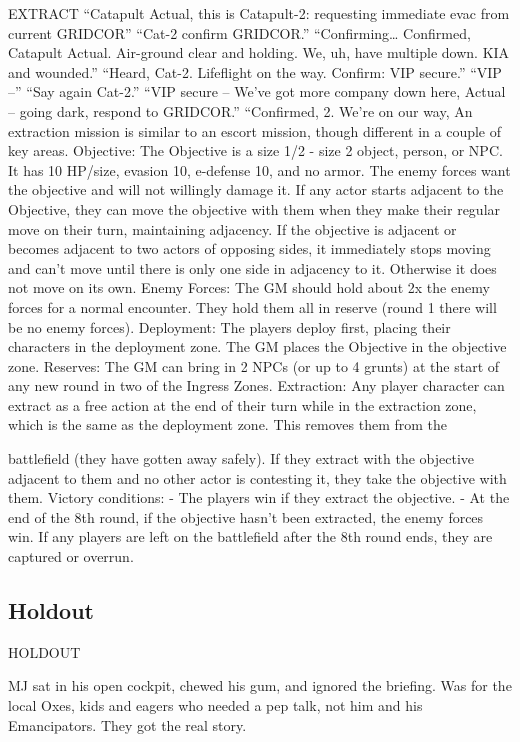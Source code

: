 EXTRACT
“Catapult Actual, this is Catapult-2: requesting immediate evac from current GRIDCOR” “Cat-2 confirm GRIDCOR.” “Confirming… Confirmed, Catapult Actual. Air-ground clear and holding. We, uh, have multiple down. KIA and wounded.” “Heard, Cat-2. Lifeflight on the way. Confirm: VIP secure.” “VIP --” “Say again Cat-2.” “VIP secure -- We’ve got more company down here, Actual -- going dark, respond to GRIDCOR.” “Confirmed, 2. We’re on our way, An extraction mission is similar to an escort mission, though different in a couple of key areas. Objective: The Objective is a size 1/2 - size 2 object, person, or NPC. It has 10 HP/size, evasion 10, e-defense 10, and no armor. The enemy forces want the objective and will not willingly damage it. If any actor starts adjacent to the Objective, they can move the objective with them when they make their regular move on their turn, maintaining adjacency. If the objective is adjacent or becomes adjacent to two actors of opposing sides, it immediately stops moving and can’t move until there is only one side in adjacency to it. Otherwise it does not move on its own.
Enemy Forces: The GM should hold about 2x the enemy forces for a normal encounter. They
hold them all in reserve (round 1 there will be no enemy forces).
Deployment: The players deploy first, placing their characters in the deployment zone. The GM
places the Objective in the objective zone.
Reserves: The GM can bring in 2 NPCs (or up to 4 grunts) at the start of any new round in two of
the Ingress Zones.
Extraction: Any player character can extract as a free action at the end of their turn while in the
extraction zone, which is the same as the deployment zone. This removes them from the




battlefield (they have gotten away safely). If they extract with the objective adjacent to them and
no other actor is contesting it, they take the objective with them.
Victory conditions:
         - The players win if they extract the objective.
         - At the end of the 8th round, if the objective hasn’t been extracted, the enemy forces win.
         If any players are left on the battlefield after the 8th round ends, they are captured or
        overrun.


\subsection{Holdout}

HOLDOUT

          MJ sat in his open cockpit, chewed his gum, and ignored the briefing. Was for the local Oxes, kids
          and eagers who needed a pep talk, not him and his Emancipators. They got the real story.

